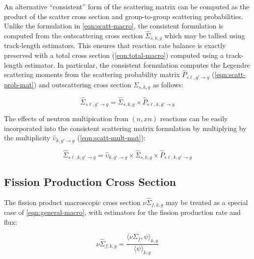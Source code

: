 
An alternative ``consistent'' form of the scattering matrix can be computed as the product of the scatter cross section and group-to-group scattering probabilities. Unlike the formulation in \cref{eqn:scatt-macro}, the consistent formulation is computed from the outscattering cross section $\hat{\Sigma}_{s,k,g}$ which may be tallied using track-length estimators. This ensures that reaction rate balance is exactly preserved with a total cross section (\cref{eqn:total-macro}) computed using a track-length estimator. In particular, the consistent formulation computes the Legendre scattering moments from the scattering probability matrix $\hat{P}_{s\ell,g'\rightarrow g}$ (\cref{eqn:scatt-prob-mat}) and outscattering cross section $\Sigma_{s,k,g}$ as follows:

\begin{equation}
\label{eqn:scatt-mat-consistent}
\hat{\Sigma}_{s\ell,g'\rightarrow g} = \hat{\Sigma}_{s,k,g} \times \hat{P}_{s\ell,k,g'\rightarrow g}
\end{equation}

\noindent The effects of neutron multipication from $(n,xn)$ reactions can be easily incorporated into the consistent scattering matrix formulation by multiplying by the multiplicity $\hat{\upsilon}_{k,g'\rightarrow g}$ (\cref{eqn:scatt-mult-mat}):

\begin{equation}
\label{eqn:nuscatt-mat-consistent}
\hat{\Sigma}_{s\ell,k,g'\rightarrow g} = \hat{\upsilon}_{k,g'\rightarrow g} \times \hat{\Sigma}_{s,k,g} \times \hat{P}_{s\ell,k,g'\rightarrow g}
\end{equation}

\subsection{Fission Production Cross Section}
\label{subsubsec:tally-types-fiss-prod}

The fission product macroscopic cross section $\nu\hat{\Sigma}_{f,k,g}$ may be treated as a special case of \cref{eqn:general-macro}, with estimators for the fission production rate and flux:

\begin{equation}
\label{eqn:nu-fiss-macro}
\nu\hat{\Sigma}_{f,k,g} = \frac{\langle \nu\Sigma_{f}, \psi \rangle_{k,g}}{\langle \psi \rangle_{k,g}}
\end{equation}

